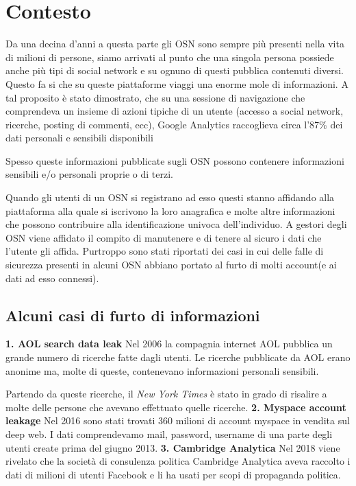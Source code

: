 \section{Contesto}
Da una decina d'anni a questa parte gli OSN sono sempre più presenti nella vita di milioni di persone, siamo arrivati al punto che una singola persona possiede anche più tipi di social network e su ognuno di questi pubblica contenuti diversi. Questo fa si che su queste piattaforme viaggi una enorme mole di informazioni. A tal proposito è stato dimostrato, che su una sessione di navigazione che comprendeva
un insieme di azioni tipiche di un utente (accesso a social network, ricerche,
posting di commenti, ecc), Google Analytics raccoglieva circa l’87\% dei dati
personali e sensibili disponibili\cite{MalandrinoScarano}

Spesso queste informazioni pubblicate sugli OSN possono contenere informazioni sensibili e/o personali proprie o di terzi. 

Quando gli utenti di un OSN si registrano ad esso questi stanno affidando alla piattaforma alla quale si iscrivono la loro anagrafica e molte altre informazioni che possono contribuire alla identificazione univoca dell'individuo. A gestori degli OSN viene affidato il compito di manutenere e di tenere al sicuro i dati che l'utente gli affida. Purtroppo sono stati riportati dei casi in cui delle falle di sicurezza presenti in alcuni OSN abbiano portato al furto di molti account(e ai dati ad esso connessi).

\subsection{Alcuni casi di furto di informazioni}
\label{ssec:exampleLeak}
\textbf{1. AOL search data leak}\cite{aolDataLeak}\newline
Nel 2006 la compagnia internet AOL pubblica un grande numero di ricerche fatte dagli utenti. Le ricerche pubblicate da AOL erano anonime ma, molte di queste, contenevano informazioni personali sensibili.

Partendo da queste ricerche, il \textit{New York Times} è stato in grado di risalire a molte delle persone che avevano effettuato quelle ricerche.\newline
\textbf{2. Myspace account leakage}\cite{myspacebreach}\newline
Nel 2016 sono stati trovati 360 milioni di account myspace in vendita sul deep web. I dati comprendevamo mail, password, username di una parte degli utenti create prima del giugno 2013.\newline
\textbf{3. Cambridge Analytica}\cite{cambridge}\newline
Nel 2018 viene rivelato che la società di consulenza politica Cambridge Analytica aveva raccolto i dati di milioni di utenti Facebook e li ha usati per scopi di propaganda politica.

